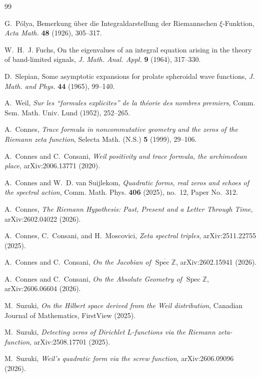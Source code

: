 \documentclass[11pt]{amsart}
\theoremstyle{definition}
\theoremstyle{remark}
\begin{document}
\begin{thebibliography}{99}

G.~P\'olya, Bemerkung \"uber die Integraldarstellung der Riemannschen
\(\xi\)-Funktion, \emph{Acta Math.} \textbf{48} (1926), 305--317.

W.~H.~J. Fuchs, On the eigenvalues of an integral equation arising in the
theory of band-limited signals, \emph{J. Math. Anal. Appl.} \textbf{9}
(1964), 317--330.

D.~Slepian, Some asymptotic expansions for prolate spheroidal wave
functions, \emph{J. Math. and Phys.} \textbf{44} (1965), 99--140.

A.~Weil,
\emph{Sur les ``formules explicites'' de la th\'eorie des nombres premiers},
Comm. Sem. Math. Univ. Lund (1952), 252--265.

A.~Connes,
\emph{Trace formula in noncommutative geometry and the zeros of the
Riemann zeta function},
Selecta Math. (N.S.) \textbf{5} (1999), 29--106.

A.~Connes and C.~Consani,
\emph{Weil positivity and trace formula, the archimedean place},
arXiv:2006.13771 (2020).

A.~Connes and W.~D. van Suijlekom,
\emph{Quadratic forms, real zeros and echoes of the spectral action},
Comm. Math. Phys. \textbf{406} (2025), no.~12, Paper No.~312.

A.~Connes,
\emph{The Riemann Hypothesis: Past, Present and a Letter Through Time},
arXiv:2602.04022 (2026).

A.~Connes, C.~Consani, and H.~Moscovici,
\emph{Zeta spectral triples},
arXiv:2511.22755 (2025).

A.~Connes and C.~Consani,
\emph{On the Jacobian of \(\overline{\operatorname{Spec}\mathbb Z}\)},
arXiv:2602.15941 (2026).

A.~Connes and C.~Consani,
\emph{On the Absolute Geometry of \(\operatorname{Spec}\mathbb Z\)},
arXiv:2606.06604 (2026).

M.~Suzuki,
\emph{On the Hilbert space derived from the Weil distribution},
Canadian Journal of Mathematics, FirstView (2025).

M.~Suzuki,
\emph{Detecting zeros of Dirichlet \(L\)-functions via the Riemann
zeta-function},
arXiv:2508.17701 (2025).

M.~Suzuki,
\emph{Weil's quadratic form via the screw function},
arXiv:2606.09096 (2026).


\end{thebibliography}
\end{document}
